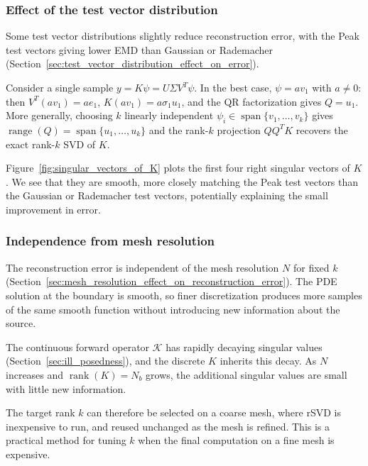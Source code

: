 \subsubsection{Effect of the test vector distribution}

Some test vector distributions slightly reduce reconstruction error, with the Peak test vectors giving lower EMD than Gaussian or Rademacher (Section~\ref{sec:test_vector_distribution_effect_on_error}).

Consider a single sample $y = K \psi = U \Sigma V^T \psi$. In the best case, $\psi = a v_1$ with $a \neq 0$: then $V^T(a v_1) = a e_1$, $K(a v_1) = a \sigma_1 u_1$, and the QR factorization gives $Q = u_1$. More generally, choosing $k$ linearly independent $\psi_i \in \operatorname{span}\{ v_1,\dots,v_k \}$ gives $\operatorname{range}(Q) = \operatorname{span}\{u_1,\dots,u_k\}$ and the rank-$k$ projection $QQ^T K$ recovers the exact rank-$k$ SVD of $K$.

Figure~\ref{fig:singular_vectors_of_K} plots the first four right singular vectors of $K$. We see that they are smooth, more closely matching the Peak test vectors than the Gaussian or Rade\-macher test vectors, potentially explaining the small improvement in error.


\subsubsection{Independence from mesh resolution}
The reconstruction error is independent of the mesh resolution $N$ for fixed $k$ (Section~\ref{sec:mesh_resolution_effect_on_reconstruction_error}). The PDE solution at the boundary is smooth, so finer discretization produces more samples of the same smooth function without introducing new information about the source.

The continuous forward operator $\mathcal{K}$ has rapidly decaying singular values (Section~\ref{sec:ill_posedness}), and the discrete $K$ inherits this decay. As $N$ increases and $\operatorname{rank}(K) = N_b$ grows, the additional singular values are small with little new information.

The target rank $k$ can therefore be selected on a coarse mesh, where rSVD is inexpensive to run, and reused unchanged as the mesh is refined. This is a practical method for tuning $k$ when the final computation on a fine mesh is expensive.


